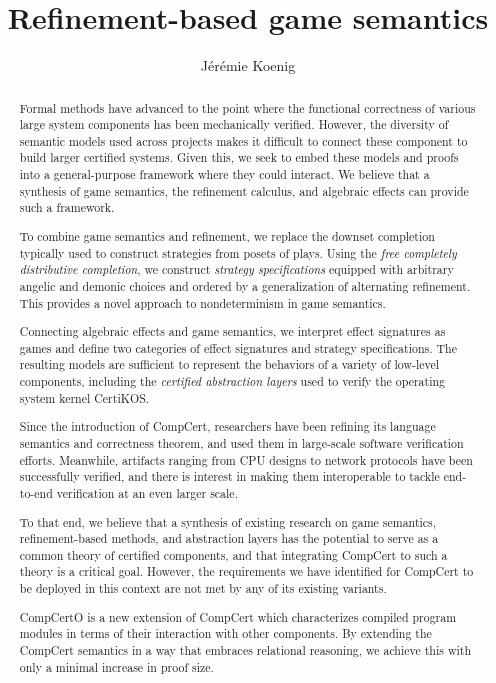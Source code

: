 \documentclass[draft,11pt]{report}
\title{Refinement-based game semantics}
\author{J\'er\'emie Koenig}
\newcommand{\gcat}{\mathcal{G}_{\sqsubseteq}}
\begin{document}
\begin{abstract} %


Formal methods have advanced to the point where
the functional correctness of various large
system components has been mechanically verified.
However,
the diversity of semantic models used across projects
makes it difficult to connect these component
to build larger certified systems.
Given this,
we seek to embed these models and proofs
into a general-purpose framework
where they could interact. %
We believe that a synthesis of game
semantics, the refinement calculus, and algebraic effects can
provide such a framework.

To combine game semantics and refinement, we replace the downset
completion typically used to construct strategies from posets of plays.
Using the \emph{free completely distributive completion},
we construct \emph{strategy specifications}
equipped with arbitrary angelic and demonic choices
and ordered by a generalization of alternating refinement.
This provides a novel approach to nondeterminism in game semantics.

Connecting algebraic effects and game semantics, we interpret effect
signatures as games and define two
categories %
of effect signatures and strategy
specifications.
The resulting models are sufficient to represent the behaviors
of a variety of low-level components,
including the \emph{certified abstraction layers}
used to verify the operating system
kernel CertiKOS. %



Since the introduction of CompCert,
researchers have been refining
its language semantics and correctness theorem,
and used them in
large-scale software verification efforts.
Meanwhile,
artifacts ranging from CPU designs to network protocols
have been successfully verified,
and there is interest in
making them interoperable
to tackle end-to-end verification
at an even larger scale.

To that end,
we believe that
a synthesis of existing research on
game semantics,
refinement-based methods, and
abstraction layers
has the potential to serve as a common theory
of certified components,
and that integrating CompCert to such a theory
is a critical goal.
However,
the requirements we have identified for
CompCert to be deployed in this context
are not met by any of its existing variants.

CompCertO is
a new extension of CompCert
which characterizes compiled program modules
in terms of their interaction with other components.
By extending the CompCert semantics
in a way that embraces relational reasoning,
we achieve this with only a minimal increase
in proof size.


\end{abstract}
\end{document}

